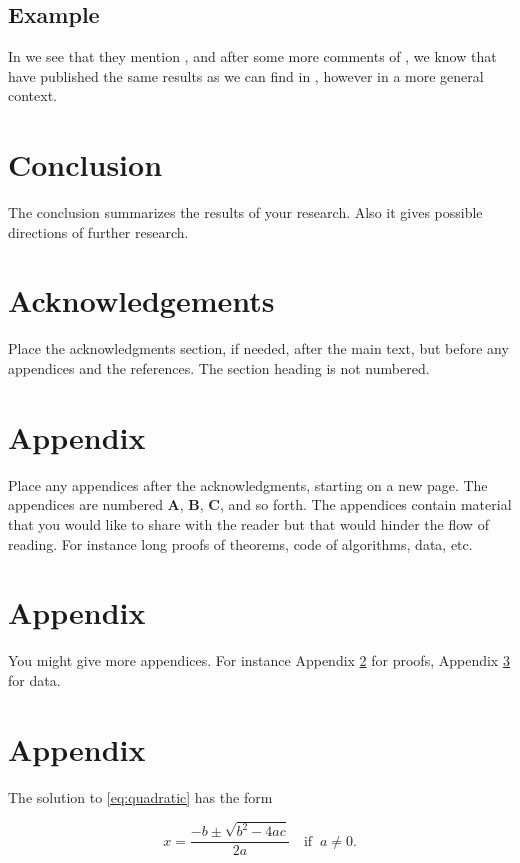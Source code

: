\documentclass[a4paper,11pt]{article}
\theoremstyle{plain}
\theoremstyle{definition}
\begin{document}
\subsection{Example}
In \citet{asmus07} we see that they mention \citep{blitzstein10},
and after some more comments of \citet{asrub1}, we know that
\citet{evkekro07} have published the same results
as we can find in \citep{alon,garvels00,ross06},
however in a more general context.

\section{Conclusion}\label{s:con}
The conclusion summarizes the results of your research.
Also it gives possible directions of further research.

\section*{Acknowledgements}
Place the acknowledgments section, if needed, after the main text, 
but before any appendices and the references. The section heading is not numbered.

\newpage
\appendix

\section{Appendix}\label{s:app1}
Place any appendices after the acknowledgments, starting on a new page.
The appendices are numbered
\textbf{A}, \textbf{B}, \textbf{C}, and so forth.
The appendices contain material that you would like to share with the
reader but that would hinder the flow of reading. For instance long
proofs of theorems, code of algorithms, data, etc.

\section{Appendix}\label{s:app2}
You might give more appendices. For instance Appendix \ref{s:app1} for
proofs, Appendix \ref{s:app2} for data.

\section{Appendix}\label{app:quadratic}
The solution to \eqref{eq:quadratic} has the form

\begin{equation} \label{eq:quadraticsol}
x = \frac{-b \pm \sqrt{b^2-4ac}}{2a} \quad\text{if}\;\; a \ne 0.
\end{equation}



\end{document}
